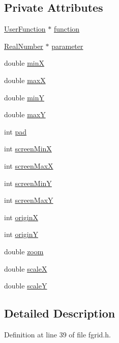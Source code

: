 \subsection*{Private Attributes}
\begin{DoxyCompactItemize}
\item 
\hyperlink{classUserFunction}{User\+Function} $\ast$ \hyperlink{classGrid_a69d704fb7924b50175b937798fe6d67d}{function}
\item 
\hyperlink{structRealNumber}{Real\+Number} $\ast$ \hyperlink{classGrid_a37df3261f985852f871847769c8b833c}{parameter}
\item 
double \hyperlink{classGrid_a70c775fad6a2cfa910a7e1f8c5b3e9b2}{minX}
\item 
double \hyperlink{classGrid_ad093fee95a663d4b82c85bea9a1241ec}{maxX}
\item 
double \hyperlink{classGrid_af592907852d983fe13ef9581ffd77e6b}{minY}
\item 
double \hyperlink{classGrid_acca4c514021d9f6733579b699ac68436}{maxY}
\item 
int \hyperlink{classGrid_a2bf4a157b130ed18d78d2e9a6760a6a8}{pad}
\item 
int \hyperlink{classGrid_a5876a8eaa41c1ac49fec464475d7cbb6}{screen\+MinX}
\item 
int \hyperlink{classGrid_ad662ef34930a80011080a45a975cae79}{screen\+MaxX}
\item 
int \hyperlink{classGrid_a18e1493a917be10c5454f44e1114fbdc}{screen\+MinY}
\item 
int \hyperlink{classGrid_a9ff802b20cf95e066646d24aa284a547}{screen\+MaxY}
\item 
int \hyperlink{classGrid_a0c0e10fa32d7fa78985cba0df1a34a0f}{originX}
\item 
int \hyperlink{classGrid_add0854295a7e36ab9f77889862bfda0e}{originY}
\item 
double \hyperlink{classGrid_a9a224c7ba4c55ff3672ae1b950796768}{zoom}
\item 
double \hyperlink{classGrid_a33d8811a6746553710cd815a535a9f13}{scaleX}
\item 
double \hyperlink{classGrid_ab973a5a172794c1e8d87f2cad3f7cea9}{scaleY}
\end{DoxyCompactItemize}


\subsection{Detailed Description}


Definition at line 39 of file fgrid.\+h.



